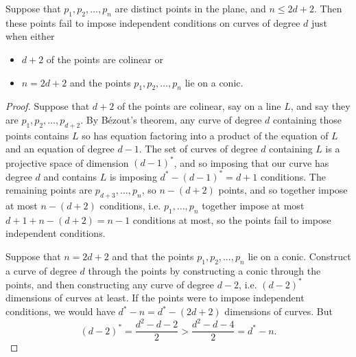 \begin{theorem}\label{theorem:independence}
Suppose that \(p_1,p_2,\dots,p_n\) are distinct points in the plane, and \(n \le 2d+2\).
Then these points fail to impose independent conditions on curves of degree \(d\) just when either 
\begin{itemize}
\item
\(d+2\) of the points are colinear or
\item
\(n=2d+2\) and the points \(p_1,p_2,\dots,p_n\) lie on a conic.
\end{itemize}
\end{theorem}
\begin{proof}
Suppose that \(d+2\) of the points are colinear, say on a line \(L\), and say they are \(p_1,p_2,\dots,p_{d+2}\).
By B\'ezout's theorem, any curve of degree \(d\) containing those points contains \(L\) so has equation factoring into a product of the equation of \(L\) and an equation of degree \(d-1\).
The set of curves of degree \(d\) containing \(L\) is a projective space of dimension \((d-1)^*\), and so imposing that our curve has degree \(d\) and contains \(L\) is imposing \(d^*-(d-1)^*=d+1\) conditions.
The remaining points are \(p_{d+3},\dots,p_n\), so \(n-(d+2)\) points, and so together impose at most \(n-(d+2)\) conditions, i.e. \(p_1,\dots,p_n\) together impose at most \(d+1+n-(d+2)=n-1\) conditions at most, so the points fail to impose independent conditions.

Suppose that \(n=2d+2\) and that the points \(p_1,p_2,\dots,p_n\) lie on a conic.
Construct a curve of degree \(d\) through the points by constructing a conic through the points, and then constructing any curve of degree \(d-2\), i.e. \((d-2)^*\) dimensions of curves at least.
If the points were to impose independent conditions, we would have \(d^*-n=d^*-(2d+2)\) dimensions of curves.
But
\[
(d-2)^* = \frac{d^2-d-2}{2} > \frac{d^2-d-4}{2} = d^*-n.
\]


\end{proof}
